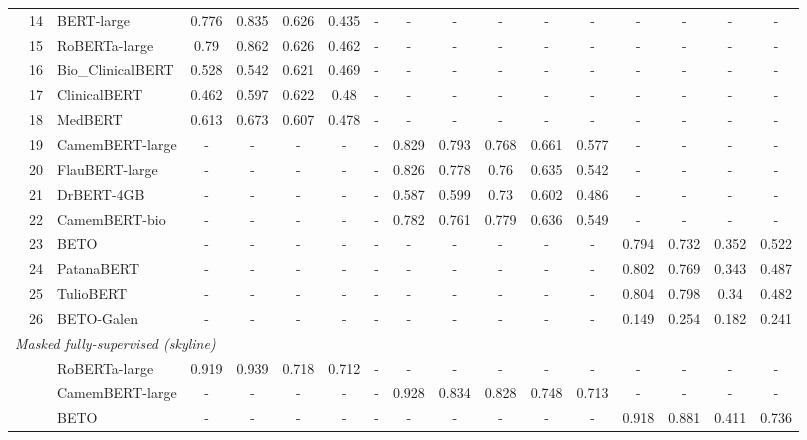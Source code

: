 {\begin{tabular}{lll|ccccc|ccccc|cccc}
 & 14 & BERT-large & 0.776 & 0.835 & 0.626 & 0.435 & - & - & - & - & - & - & - & - & - & - \\
 & 15 & RoBERTa-large & 0.79 & 0.862 & 0.626 & 0.462 & - & - & - & - & - & - & - & - & - & - \\
 & 16 & Bio\_ClinicalBERT & 0.528 & 0.542 & 0.621 & 0.469 & - & - & - & - & - & - & - & - & - & - \\
 & 17 & ClinicalBERT & 0.462 & 0.597 & 0.622 & 0.48 & - & - & - & - & - & - & - & - & - & - \\
 & 18 & MedBERT & 0.613 & 0.673 & 0.607 & 0.478 & - & - & - & - & - & - & - & - & - & - \\
 & 19 & CamemBERT-large & - & - & - & - & - & 0.829 & 0.793 & 0.768 & 0.661 & 0.577 & - & - & - & - \\
 & 20 & FlauBERT-large & - & - & - & - & - & 0.826 & 0.778 & 0.76 & 0.635 & 0.542 & - & - & - & - \\
 & 21 & DrBERT-4GB & - & - & - & - & - & 0.587 & 0.599 & 0.73 & 0.602 & 0.486 & - & - & - & - \\
 & 22 & CamemBERT-bio & - & - & - & - & - & 0.782 & 0.761 & 0.779 & 0.636 & 0.549 & - & - & - & - \\
 & 23 & BETO & - & - & - & - & - & - & - & - & - & - & 0.794 & 0.732 & 0.352 & 0.522 \\
 & 24 & PatanaBERT & - & - & - & - & - & - & - & - & - & - & 0.802 & 0.769 & 0.343 & 0.487 \\
 & 25 & TulioBERT & - & - & - & - & - & - & - & - & - & - & 0.804 & 0.798 & 0.34 & 0.482 \\
 & 26 & BETO-Galen & - & - & - & - & - & - & - & - & - & - & 0.149 & 0.254 & 0.182 & 0.241 \\
\midrule
\midrule
\multicolumn{17}{l}{\textit{Masked fully-supervised (skyline)}} \\
\midrule
 & & RoBERTa-large & 0.919 & 0.939 & 0.718 & 0.712 & - & - & - & - & - & - & - & - & - & - \\
 & & CamemBERT-large & - & - & - & - & - & 0.928 & 0.834 & 0.828 & 0.748 & 0.713 & - & - & - & - \\
 & & BETO & - & - & - & - & - & - & - & - & - & - & 0.918 & 0.881 & 0.411 & 0.736 \\
\bottomrule
\end{tabular}}